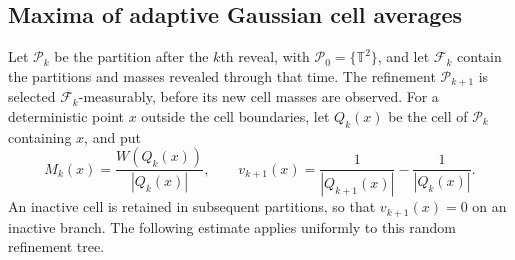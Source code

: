 \documentclass[11pt]{article}
\theoremstyle{definition}
\theoremstyle{remark}
\numberwithin{equation}{section}
\newcommand{\T}{\mathbb T}
\newcommand{\F}{\mathcal F}
\newcommand{\pr}{\mathcal P}
\begin{document}
\subsection{Maxima of adaptive Gaussian cell averages}
\label{not:revealedfiltration}
Let $\pr_k$ be the partition after the $k$th reveal, with
$\pr_0=\{\T^2\}$, and let $\F_k$ contain the partitions and masses
revealed through that time. The refinement $\pr_{k+1}$ is selected
$\F_k$-measurably, before its new cell masses are observed.
For a deterministic point $x$ outside the cell boundaries, let
$Q_k(x)$ be the cell of $\pr_k$ containing $x$, and put
\begin{equation}\label{eq:cellmartnotation}
 M_k(x)=\frac{W(Q_k(x))}{|Q_k(x)|},\qquad
 v_{k+1}(x)=\frac1{|Q_{k+1}(x)|}-\frac1{|Q_k(x)|}.
\end{equation}
An inactive cell is retained in subsequent partitions, so that
$v_{k+1}(x)=0$ on an inactive branch. The following estimate applies
uniformly to this random refinement tree.
\end{document}
